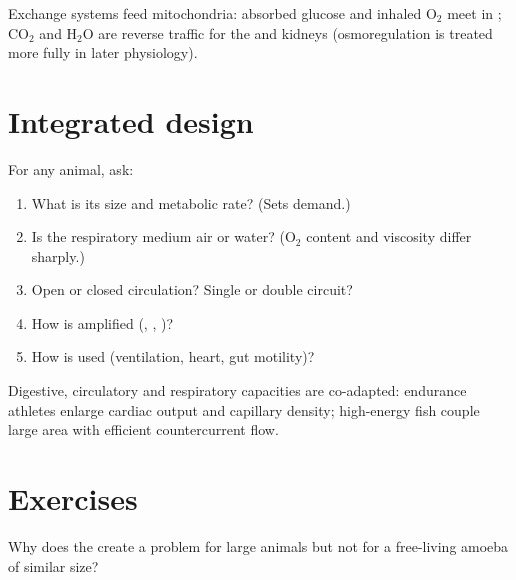 \begin{remark}
\label{rem:g12:animal-exchange:link}
Exchange systems feed mitochondria: absorbed glucose and inhaled O$_2$
meet in ; CO$_2$ and H$_2$O are reverse traffic for
the  and kidneys (osmoregulation is treated more fully in later
physiology).
\end{remark}

\section{Integrated design}

\begin{method}
\label{met:g12:animal-exchange:audit}
For any animal, ask:
\begin{enumerate}
  \item What is its size and metabolic rate? (Sets demand.)
  \item Is the respiratory medium air or water? (O$_2$ content and
        viscosity differ sharply.)
  \item Open or closed circulation? Single or double circuit?
  \item How is  amplified (, , )?
  \item How is  used (ventilation, heart, gut motility)?
\end{enumerate}
\end{method}

\begin{proposition}\label{prop:g12:animal-exchange:match}
Digestive, circulatory and respiratory capacities are co-adapted:
endurance athletes enlarge cardiac output and capillary density;
high-energy fish couple large  area with efficient countercurrent
flow.
\end{proposition}
\admitted

\section{Exercises}

\begin{exercise}[$\star$]\label{exo:g12:animal-exchange:1}
Why does the  create a problem for large animals
but not for a free-living amoeba of similar  size?
\end{exercise}

